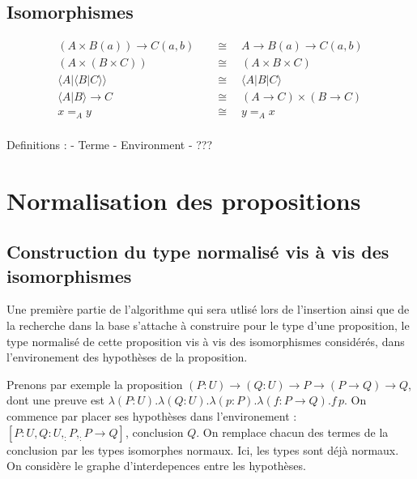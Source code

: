\documentclass[12pt, a4paper]{article}
\begin{document}

\subsection{Isomorphismes}



\begin{align*}
(A \times B(a)) \rightarrow C(a, b)                   \quad&\cong\quad   A \rightarrow B(a) \rightarrow C(a, b)       \\
(A \times (B \times C))                               \quad&\cong\quad   (A \times B \times C)                        \\
\langle A | \langle B | C\rangle\rangle               \quad&\cong\quad   \langle A | B | C\rangle                     \\
\langle A | B \rangle \rightarrow C                   \quad&\cong\quad   (A \rightarrow C) \times (B \rightarrow C)   \\
x =_A y                                               \quad&\cong\quad   y =_A x                                      \\
\end{align*}

Definitions : 
  - Terme
  - Environment
  - ???

\section{Normalisation des propositions}
\subsection{Construction du type normalisé vis à vis des isomorphismes}
Une première partie de l'algorithme qui sera utlisé lors de l'insertion ainsi que de la recherche dans la base s'attache à construire pour le type d'une proposition, le type normalisé de cette proposition vis à vis des isomorphismes considérés, dans l'environement des hypothèses de la proposition.

Prenons par exemple la proposition $(P : U) \rightarrow (Q : U) \rightarrow P \rightarrow (P \rightarrow Q) \rightarrow Q$, dont une preuve est $\lambda (P : U). \lambda (Q : U). \lambda (p : P). \lambda (f : P \rightarrow Q). f\,p$. On commence par placer ses hypothèses dans l'environement : $[P : U, Q : U, _ : P, _ : P \rightarrow Q]$, conclusion $Q$. On remplace chacun des termes de la conclusion par les types isomorphes normaux. Ici, les types sont déjà normaux. On considère le graphe d'interdepences entre les hypothèses.
\end{document}
